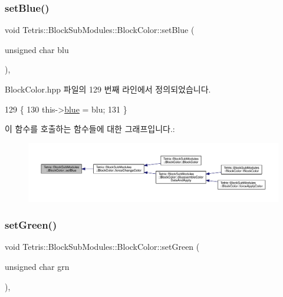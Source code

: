 \subsubsection{\texorpdfstring{set\+Blue()}{setBlue()}}
{\footnotesize\ttfamily void Tetris\+::\+Block\+Sub\+Modules\+::\+Block\+Color\+::set\+Blue (\begin{DoxyParamCaption}\item[{unsigned char}]{blu }\end{DoxyParamCaption})\hspace{0.3cm}{\ttfamily [inline]}, {\ttfamily [protected]}}



Block\+Color.\+hpp 파일의 129 번째 라인에서 정의되었습니다.


\begin{DoxyCode}
129                                            \{
130                 this->\hyperlink{class_tetris_1_1_block_sub_modules_1_1_block_color_af04e78b9a1c2f7625863c289c4a741e3}{blue} = blu;
131             \}
\end{DoxyCode}
이 함수를 호출하는 함수들에 대한 그래프입니다.\+:
\nopagebreak
\begin{figure}[H]
\begin{center}
\leavevmode
\includegraphics[width=350pt]{de/d44/class_tetris_1_1_block_sub_modules_1_1_block_color_ac624156bd1f77a20d6e1d4c8cbff36d3_icgraph}
\end{center}
\end{figure}
\mbox{\label{class_tetris_1_1_block_sub_modules_1_1_block_color_aeea8ab6d5f36d35fd4f28818349661ab}} 
\subsubsection{\texorpdfstring{set\+Green()}{setGreen()}}
{\footnotesize\ttfamily void Tetris\+::\+Block\+Sub\+Modules\+::\+Block\+Color\+::set\+Green (\begin{DoxyParamCaption}\item[{unsigned char}]{grn }\end{DoxyParamCaption})\hspace{0.3cm}{\ttfamily [inline]}, {\ttfamily [protected]}}



